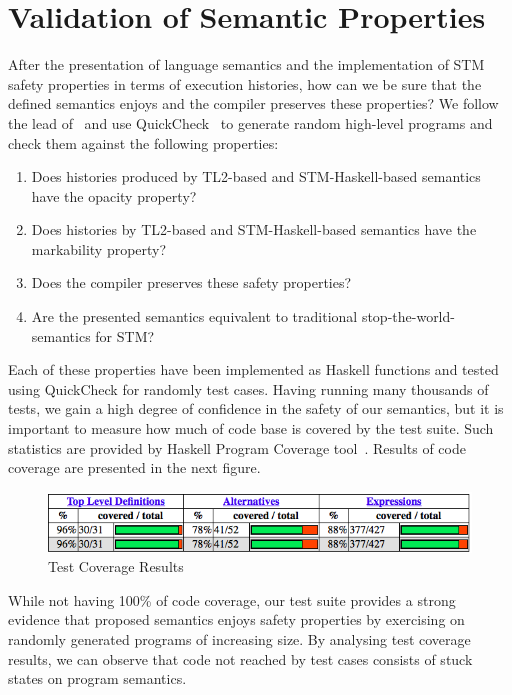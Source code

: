 \documentclass[3p,times,procedia]{elsarticle}
\theoremstyle{definition}
\begin{document}
\section{Validation of Semantic Properties}

After the presentation of language semantics and the implementation of
STM safety properties in terms of execution histories, how can we
be sure that the defined semantics enjoys and the compiler preserves these
properties? We follow the lead of~\cite{Hu08} and use QuickCheck~\cite{Claessen00} to
generate random high-level programs and check them against the following properties:

\begin{enumerate}
  \item Does histories produced by TL2-based and STM-Haskell-based semantics have the opacity property?
  \item Does histories by TL2-based and STM-Haskell-based semantics have the markability property?
  \item Does the compiler preserves these safety properties? 
  \item Are the presented semantics equivalent to traditional stop-the-world-semantics for STM?
\end{enumerate}

Each of these properties have been implemented as Haskell functions and tested using QuickCheck for randomly test cases.
Having running many thousands of tests, we gain a high degree of confidence in the safety of our semantics, but it is
important to measure how much of code base is covered by the test suite. Such statistics are provided by Haskell Program Coverage
tool~\cite{Gill2007}. Results of code coverage are presented in the next figure.

\begin{figure}[!htb]
\centering
\includegraphics[scale=0.38]{coverage.png}
\caption{Test Coverage Results}
\label{fig:test-coverage}
\end{figure}
While not having 100\% of code coverage, our test suite provides a strong evidence that proposed semantics enjoys
safety properties by exercising on randomly generated programs of increasing size. By analysing test coverage
results, we can observe that code not reached by test cases consists of stuck states on program semantics.
\end{document}
